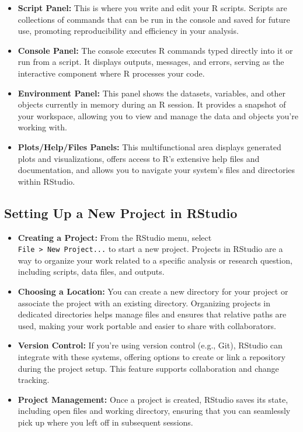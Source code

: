 \documentclass[
]{book}
\begin{document}
\begin{itemize}
\item
  \textbf{Script Panel:} This is where you write and edit your R scripts. Scripts are collections of commands that can be run in the console and saved for future use, promoting reproducibility and efficiency in your analysis.
\item
  \textbf{Console Panel:} The console executes R commands typed directly into it or run from a script. It displays outputs, messages, and errors, serving as the interactive component where R processes your code.
\item
  \textbf{Environment Panel:} This panel shows the datasets, variables, and other objects currently in memory during an R session. It provides a snapshot of your workspace, allowing you to view and manage the data and objects you're working with.
\item
  \textbf{Plots/Help/Files Panels:} This multifunctional area displays generated plots and visualizations, offers access to R's extensive help files and documentation, and allows you to navigate your system's files and directories within RStudio.
\end{itemize}

\hypertarget{setting-up-a-new-project-in-rstudio}{%
\subsection*{Setting Up a New Project in RStudio}\label{setting-up-a-new-project-in-rstudio}}

\begin{itemize}
\item
  \textbf{Creating a Project:} From the RStudio menu, select \texttt{File\ \textgreater{}\ New\ Project...} to start a new project. Projects in RStudio are a way to organize your work related to a specific analysis or research question, including scripts, data files, and outputs.
\item
  \textbf{Choosing a Location:} You can create a new directory for your project or associate the project with an existing directory. Organizing projects in dedicated directories helps manage files and ensures that relative paths are used, making your work portable and easier to share with collaborators.
\item
  \textbf{Version Control:} If you're using version control (e.g., Git), RStudio can integrate with these systems, offering options to create or link a repository during the project setup. This feature supports collaboration and change tracking.
\item
  \textbf{Project Management:} Once a project is created, RStudio saves its state, including open files and working directory, ensuring that you can seamlessly pick up where you left off in subsequent sessions.
\end{itemize}
\end{document}
